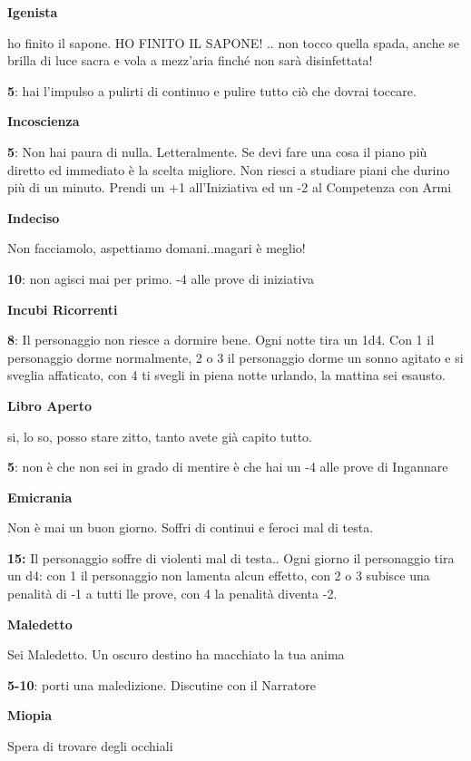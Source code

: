 \documentclass[a4paper,11pt,twoside,openany]{book}
\begin{document}
\textbf{Igenista}

ho finito il sapone. HO FINITO IL SAPONE! .. non tocco quella spada, anche se brilla di luce sacra e vola a mezz'aria finché non sarà disinfettata!

\textbf{5}: hai l'impulso a pulirti di continuo e pulire tutto ciò che dovrai toccare.

\textbf{Incoscienza}

\textbf{5}: Non hai paura di nulla. Letteralmente. Se devi fare una cosa il piano più diretto ed immediato è la scelta migliore. Non riesci a studiare piani che durino più di un minuto. Prendi un +1 all'Iniziativa ed un -2 al Competenza con Armi

\textbf{Indeciso}

Non facciamolo, aspettiamo domani..magari è meglio!

\textbf{10}: non agisci mai per primo. -4 alle prove di iniziativa

\textbf{Incubi Ricorrenti}

\textbf{8}: Il personaggio non riesce a dormire bene. Ogni notte tira un 1d4. Con 1 il personaggio dorme normalmente, 2 o 3 il personaggio dorme un sonno agitato e si sveglia affaticato, con 4 ti svegli in piena notte urlando, la mattina sei esausto.

\textbf{Libro Aperto}

si, lo so, posso stare zitto, tanto avete già capito tutto.

\textbf{5}: non è che non sei in grado di mentire è che hai un -4 alle prove di Ingannare

\textbf{Emicrania}

Non è mai un buon giorno. Soffri di continui e feroci mal di testa.

\textbf{15:} Il personaggio soffre di violenti mal di testa.. Ogni giorno il personaggio tira un d4: con 1 il personaggio non lamenta alcun effetto, con 2 o 3 subisce una penalità di -1 a tutti lle prove, con 4 la penalità diventa -2.

\textbf{Maledetto}

Sei Maledetto. Un oscuro destino ha macchiato la tua anima

\textbf{5-10}: porti una maledizione. Discutine con il Narratore

\textbf{Miopia}

Spera di trovare degli occhiali
\end{document}
